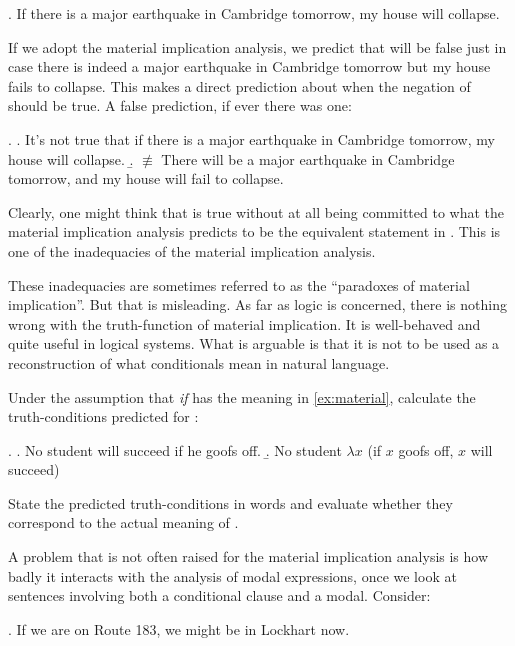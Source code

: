\ex. \label{earthquake}If there is a major earthquake in Cambridge tomorrow, my house will collapse.

If we adopt the material implication analysis, we predict that \Last will be false just in case there is indeed a major earthquake in Cambridge tomorrow but my house fails to collapse. This makes a direct prediction about when the negation of \Last should be true. A false prediction, if ever there was one:

\ex. \a. \label{neg-earthquake}It's not true that if there is a major earthquake in Cambridge tomorrow, my house will collapse. 
\b. $\not\equiv$ There will be a major earthquake in Cambridge tomorrow, and my house will fail to collapse.

Clearly, one might think that \Last[a] is true without at all being committed to what the material implication analysis predicts to be the equivalent statement in \Last[b]. This is one of the inadequacies of the material implication analysis.

These inadequacies are sometimes referred to as the ``paradoxes of material implication''. But that is misleading. As far as logic is concerned, there is nothing wrong with the truth-function of material implication. It is well-behaved and quite useful in logical systems. What is arguable is that it is not to be used as a reconstruction of what conditionals mean in natural language.

\begin{exercise}
  Under the assumption that \emph{if} has the meaning in \ref{ex:material}, calculate the truth-conditions predicted for \Next:

\ex. \a. No student will succeed if he goofs off.
\b. No student $\lambda x$ (if $x$ goofs off, $x$ will succeed)

State the predicted truth-conditions in words and evaluate whether they correspond to the actual meaning of \Last.
\eex
\end{exercise}

A 
%
%
% 
problem that is not often raised for the material implication analysis is how badly it interacts with the analysis of modal expressions, once we look at sentences involving both a conditional clause and a modal. Consider:

\ex. \label{lockhartmight}If we are on Route 183, we might be in Lockhart now.

